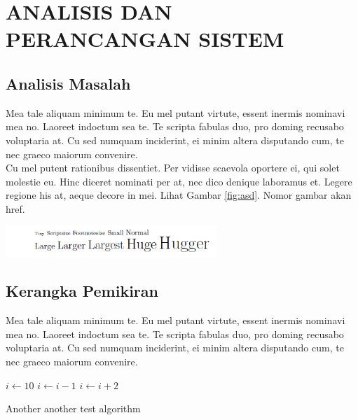 \chapter{ANALISIS DAN PERANCANGAN SISTEM}
\vspace{4.5pt}

\section{Analisis Masalah}
Mea tale aliquam minimum te. Eu mel putant virtute, essent inermis nominavi mea no. Laoreet indoctum sea te. Te scripta fabulas duo, pro doming recusabo voluptaria at. Cu sed numquam inciderint, ei minim altera disputando cum, te nec graeco maiorum convenire.\\
Cu mel putent rationibus dissentiet. Per vidisse scaevola oportere ei, qui solet molestie eu. Hinc diceret nominati per at, nec dico denique laboramus et. Legere regione his at, aeque decore in mei. Lihat Gambar \ref{fig:asd}. Nomor gambar akan href.\\

\begin{center}
	\includegraphics[width=8cm]{img/2.PNG}
	\label{fig:asd}
\end{center}

\section{Kerangka Pemikiran}
Mea tale aliquam minimum te. Eu mel putant virtute, essent inermis nominavi mea no. Laoreet indoctum sea te. Te scripta fabulas duo, pro doming recusabo voluptaria at. Cu sed numquam inciderint, ei minim altera disputando cum, te nec graeco maiorum convenire.\\

\begin{algorithm} 
  \begin{algorithmic}[1]
    \STATE $i \gets 10$
        \STATE $i \gets i-1$
    \ELSE
            \STATE $i \gets i+2$
        \ENDIF
    \ENDIF 
    \RETURN{}
  \end{algorithmic} 
  \caption{Another another test algorithm}
  \label{alg:algorithm3}
\end{algorithm}

